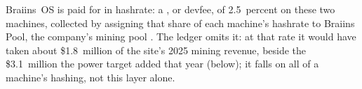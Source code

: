 Braiins~OS is paid for in hashrate: a , or devfee, of 2.5~percent on these two machines, collected by assigning that share of each machine's hashrate to Braiins Pool, the company's mining pool \autocite{braiinsoslicense,braiinsosfirmware}. The ledger omits it: at that rate it would have taken about \$1.8~million of the site's 2025 mining revenue, beside the \$3.1~million the power target added that year (below); it falls on all of a machine's hashing, not this layer alone. %

